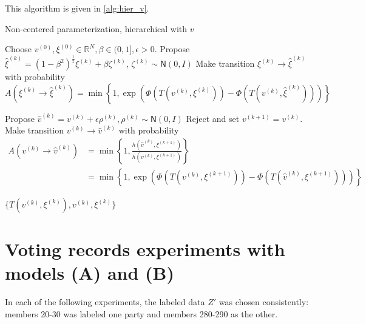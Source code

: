 \documentclass{siamart1116}
\begin{document}
        This algorithm is given in \cref{alg:hier_v}.
        \begin{algorithm}

        \caption{Non-centered parameterization, hierarchical with $v$}
        \label{alg:hier_v}
        \begin{algorithmic}
        \State Choose $v^{(0)}, \xi^{(0)} \in \mathbb{R}^N, \beta \in (0, 1], \epsilon > 0$.
        \State Propose $\hat\xi^{(k)} = (1-\beta^2)^{\frac{1}{2}}\xi^{(k)} + \beta \zeta^{(k)}$, $\zeta^{(k)} \sim \mathsf{N}(0, I)$
        \State Make transition $\xi^{(k)} \to \hat\xi^{(k)}$ with probability
        \[ A(\xi^{(k)} \to \hat\xi^{(k)}) = \min\left\{1, \exp\left(\Phi(T(v^{(k)}, \xi^{(k)})) - \Phi(T(v^{(k)}, \hat \xi^{(k)}))\right) \right\}\]

        \State Propose $\hat v^{(k)} = v^{(k)} + \epsilon \rho^{(k)}, \rho^{(k)} \sim \mathsf{N}(0,I)$
            \State Reject and set $v^{(k+1)} = v^{(k)}$.
        \Else
        \State Make transition $v^{(k)} \to \hat v^{(k)}$ with probability
        \begin{align*}
         A(v^{(k)} \to \hat v^{(k)}) &= \min\left\{1, \frac{h(\hat v^{(k)}, \xi^{(k+1)})}{h(v^{(k)}, \xi^{(k+1)})}\right\} \\
         &= \min\left\{1, \exp\left(\Phi(T(v^{(k)}, \xi^{(k+1)}))-\Phi(T(\hat v^{(k)}, \xi^{(k+1)})) \right) \right\}
         \end{align*}
        \EndIf

        \EndFor
        \State \Return $\{ T(v^{(k)},\xi^{(k)}), v^{(k)}, \xi^{(k)} \}$
        \end{algorithmic}
        \end{algorithm}

\iffalse

\section{Voting records experiments with models (A) and (B)}
    In each of the following experiments, the labeled data $Z'$ was chosen consistently: members 20-30 was labeled one party and members 280-290 as the other.
\end{document}
